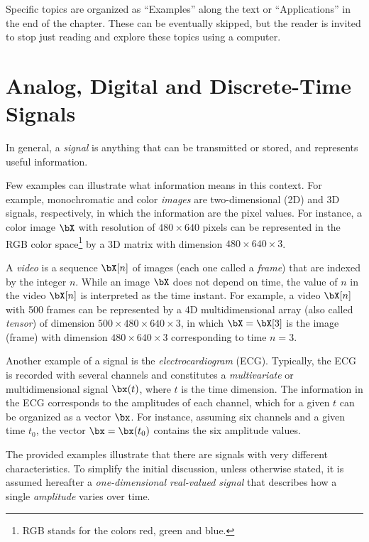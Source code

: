 Specific topics are organized as ``Examples'' along the text or ``Applications'' in the end of the chapter. These can be eventually skipped, but the reader is invited to stop just reading and explore these topics using a computer.

\section{Analog, Digital and Discrete-Time Signals}
\label{sec:ana_dig_dis}

In general, a \emph{signal} is anything that can be transmitted or stored, and represents useful information. 

Few examples can illustrate what information means in this context.
For example, monochromatic and color \emph{images} are two-dimensional (2D) and 3D signals, respectively, in which the information are the pixel values. For instance, a color image $\bX$ with resolution of $480 \times 640$ pixels can be represented in the RGB color space\footnote{RGB stands for the colors red, green and blue.} by a 3D matrix with dimension $480 \times 640 \times 3$.

A \emph{video} is a sequence $\bX[n]$ of images (each one called a \emph{frame}) that are indexed by the integer $n$. While an image $\bX$ does not depend on time, the value of $n$ in the video $\bX[n]$ is interpreted as the time instant. For example, a video $\bX[n]$ with 500 frames can be represented by a 4D multidimensional array (also called \emph{tensor}) of dimension $500 \times 480 \times 640 \times 3$, in which $\bX = \bX[3]$ is the image (frame) with dimension $480 \times 640 \times 3$ corresponding to time $n=3$.

Another example of a signal is the \emph{electrocardiogram} (ECG). Typically, the ECG is recorded with several channels and constitutes a \emph{multivariate} or multidimensional signal $\bx(t)$, where $t$ is the time dimension. The information in the ECG corresponds to the amplitudes of each channel, which for a given $t$ can be organized as a vector $\bx$. For instance, assuming six channels and a given time $t_0$, the vector $\bx=\bx(t_0)$ contains the six amplitude values.

The provided examples illustrate that there are signals with very different characteristics. To simplify the initial discussion, unless otherwise stated, it is assumed hereafter a \emph{one-dimensional real-valued signal} that describes how a single \emph{amplitude} varies over time.

